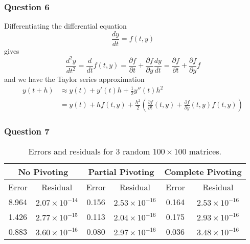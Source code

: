 \documentclass[11pt,a4paper]{article}
\begin{document}
\subsubsection*{Question 6}
Differentiating the differential equation 
	$$\frac{dy}{dt}=f(t,y)$$
gives
	$$\frac{d^2y}{dt^2}=\frac{d}{dt}f(t,y)=\frac{\partial f}{\partial t}+\frac{\partial f}{\partial y}\frac{dy}{dt}=\frac{\partial f}{\partial t}+\frac{\partial f}{\partial y}f$$
and we have the Taylor series approximation
	\begin{align*}
		y(t+h) &\approx y(t)+y'(t)h+\frac{1}{2}y''(t)h^2 \\
		&=y(t)+hf(t,y)+\frac{h^2}{2}\left(\frac{\partial f}{\partial t}(t,y)+\frac{\partial f}{\partial y}(t,y)f(t,y)\right)
	\end{align*}

\newpage
	
\subsubsection*{Question 7}
	\begin{table}[!ht]
		\begin{center}
			\begin{tabular}{|c|c|c|c|c|c|}
				\hline
				\multicolumn{2}{|c|}{No Pivoting} &\multicolumn{2}{c|}{Partial Pivoting} &\multicolumn{2}{c|}{Complete Pivoting} \\
				\hline
				Error &Residual &Error &Residual &Error &Residual \\
				\hline
				8.964 &$2.07 \times 10^{-14}$ &0.156 &$2.53 \times 10^{-16}$ &0.164 &$2.53 \times 10^{-16}$ \\
				1.426 &$2.77 \times 10^{-15}$ &0.113 &$2.04 \times 10^{-16}$ &0.175 &$2.93 \times 10^{-16}$ \\
				0.883 &$3.60 \times 10^{-16}$ &0.080 &$2.97 \times 10^{-16}$ &0.036 &$3.48 \times 10^{-16}$ \\
				\hline
			\end{tabular}
		\end{center}
		\caption{Errors and residuals for 3 random $100 \times 100$ matrices.}
	\end{table}
\end{document}
